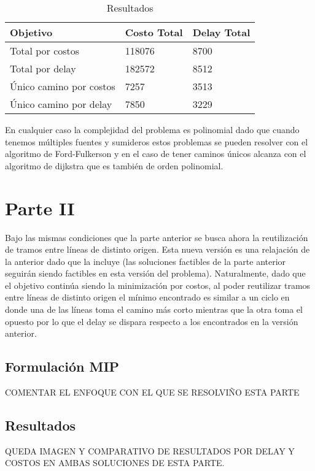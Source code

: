 \documentclass[a4paper,11pt]{article}
\theoremstyle{break}
\begin{document}
\begin{table}[h!]
	\centering
	\caption{Resultados}
	\label{table:levels-sequence}
	\begin{tabular}{|l|l|l|} \hline
		Objetivo  &   Costo Total    & Delay Total   \\
		\hline
		Total por costos        &  118076    & 8700  \\  
		\hline
		Total por delay     &  182572 & 8512 \\
		\hline
		Único camino por costos  &  7257  & 3513  \\
		\hline
		Único camino por delay    &  7850    & 3229   \\
		\hline
	\end{tabular}
\end{table}

En cualquier caso la complejidad del problema es polinomial dado que cuando tenemos múltiples fuentes y sumideros estos problemas se pueden resolver con el algoritmo de Ford-Fulkerson y en el caso de tener caminos únicos alcanza con el algoritmo de dijkstra que es también de orden polinomial.

\section{Parte II}
Bajo las mismas condiciones que la parte anterior se busca ahora la reutilización de tramos entre líneas de distinto origen. Esta nueva versión es una relajación de la anterior dado que la incluye (las soluciones factibles de la parte anterior seguirán siendo factibles en esta versión del problema).
Naturalmente, dado que el objetivo continúa siendo la minimización por costos, al poder reutilizar tramos entre líneas de distinto origen el mínimo encontrado es similar a un ciclo en donde una de las líneas toma el camino más corto mientras que la otra toma el opuesto por lo que el delay se dispara respecto a los encontrados en la versión anterior.

\subsection{Formulación MIP}
COMENTAR EL ENFOQUE CON EL QUE SE RESOLVIÑO ESTA PARTE

\subsection{Resultados}
QUEDA IMAGEN Y COMPARATIVO DE RESULTADOS POR DELAY Y COSTOS EN AMBAS SOLUCIONES DE ESTA PARTE.
\end{document}
